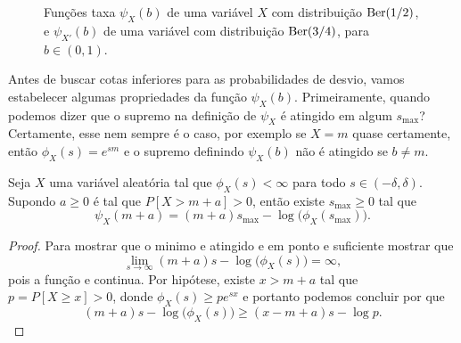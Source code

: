\begin{figure}[!ht]
  \centering
  \caption{Funções taxa $\psi_{X}(b)$ de uma variável $X$ com distribuição $\operatorname{Ber}(1/2)$, e $\psi_{X'}(b)$ de uma variável com distribuição $\operatorname{Ber}(3/4)$, para $b \in (0,1)$.}
\end{figure}

Antes de buscar cotas inferiores para as probabilidades de desvio, vamos estabelecer algumas propriedades da função $\psi_X(b)$.
Primeiramente, quando podemos dizer que o supremo na definição de $\psi_X$ é atingido em algum $s_{\text{max}}$?
Certamente, esse nem sempre é o caso, por exemplo se $X = m$ quase certamente, então $\phi_X(s) = e^{sm}$ e o supremo definindo $\psi_X(b)$ não é atingido se $b \neq m$.

\begin{lemma}
  \label{l:smax_PGD}
  Seja $X$ uma variável aleatória tal que $\phi_X(s) < \infty$ para todo $s \in (-\delta, \delta)$.
  Supondo $a \geq 0$ é tal que $P[X > m + a] > 0$, então existe $s_{\text{max}} \geq 0$ tal que
  \begin{equation}
    \psi_X(m + a) = (m + a)s_{\text{max}} - \log\big(\phi_X(s_\text{max})\big).
  \end{equation}
\end{lemma}

\begin{proof}
Para mostrar que o minimo e atingido e em ponto e suficiente mostrar que
$$ \lim_{s\to \infty} (m + a)s - \log\big(\phi_X(s)\big)=\infty,$$
pois a função e continua.
Por hipótese, existe $x > m + a$ tal que $p = P[X \geq x] > 0$, donde $\phi_X(s) \geq p e^{sx}$ e portanto podemos concluir por que
$$(m + a)s - \log\big(\phi_X(s)\big)\ge (x-m+a)s -\log p.$$

\end{proof}

